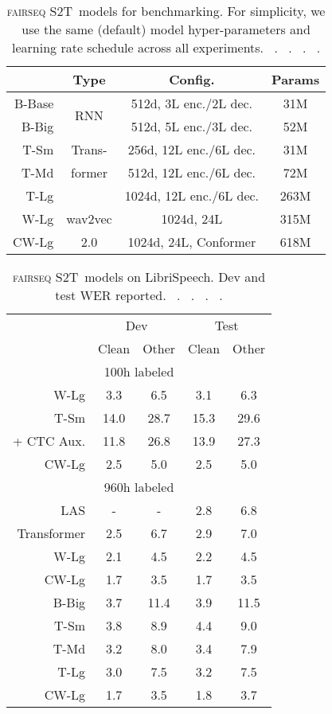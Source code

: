 \documentclass[11pt,a4paper]{article}
\newcommand{\stot}{\textsc{fairseq S2T}}
\begin{document}
\begin{table}[t]
    \centering
    \small
    \begin{tabular}{r|ccc}
    \toprule
     &  Type & Config. & Params \\
    \midrule
    B-Base & \multirow{2}{*}{RNN} & 512d, 3L enc./2L dec. & 31M \\
    B-Big &  & 512d, 5L enc./3L dec. & 52M \\
    \midrule
    T-Sm & Trans- & 256d, 12L enc./6L dec. & 31M \\
    T-Md & former & 512d, 12L enc./6L dec. & 72M \\
    T-Lg & & 1024d, 12L enc./6L dec. & 263M \\
\midrule
    W-Lg & wav2vec & 1024d, 24L & 315M \\
    CW-Lg & 2.0 & 1024d, 24L, Conformer & 618M \\
    \bottomrule
    \end{tabular}
    \caption{\stot~models for benchmarking. For simplicity, we use the same (default) model hyper-parameters and learning rate schedule across all experiments. ~\citet{berard2018end}.
    ~\citet{vaswani2017attention}. ~\citet{NEURIPS2020_92d1e1eb}. ~\citet{gulati20_interspeech}.
    }
    \label{tab:models}
\end{table}
 \begin{table}[t]
    \centering
    \small
    \begin{tabular}{r|cc|cc}
    \toprule
    & \multicolumn{2}{c|}{Dev} & \multicolumn{2}{c}{Test} \\
    & Clean & Other & Clean & Other \\
    \midrule
    \multicolumn{5}{c}{100h labeled} \\
    \midrule
    W-Lg & 3.3 & 6.5 & 3.1 & 6.3 \\
    \midrule
    T-Sm & 14.0 & 28.7 & 15.3 & 29.6 \\
    + CTC Aux. & 11.8 & 26.8 & 13.9 & 27.3 \\
    CW-Lg & 2.5 & 5.0 & 2.5 & 5.0 \\
    \midrule
    \multicolumn{5}{c}{960h labeled} \\
    \midrule
    LAS & - & - & 2.8 & 6.8 \\
    Transformer & 2.5 & 6.7 & 2.9 & 7.0 \\
    W-Lg & 2.1 & 4.5 & 2.2 & 4.5 \\
    CW-Lg & 1.7 & 3.5 & 1.7 & 3.5 \\
    \midrule
    B-Big & 3.7 & 11.4 & 3.9 & 11.5 \\
    T-Sm & 3.8 & 8.9 & 4.4 & 9.0 \\
    T-Md & 3.2 & 8.0 & 3.4 & 7.9 \\
    T-Lg & 3.0 & 7.5 & 3.2 & 7.5 \\
    CW-Lg & 1.7 & 3.5 & 1.8 & 3.7 \\
    \bottomrule
    \end{tabular}
    \caption{\stot~models on LibriSpeech. Dev and test WER reported. ~\citet{park2019specaugment}. ~\citet{synnaeve2019end}. ~\citet{NEURIPS2020_92d1e1eb}. ~\citet{zhang2020pushing}.}
    \label{tab:librispeech_results}
\end{table} 
\end{document}
